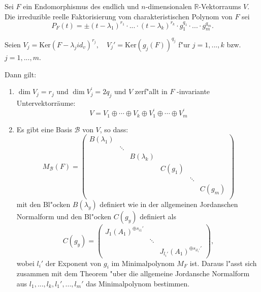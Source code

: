 \documentclass[8pt, a4paper, twocolumn, landscape]{article}
\newcommand{\comment}[1]{}
\begin{document}
\begin{theorem}
Sei $F$ ein Endomorphismus des endlich und $n$-dimensionalen $\mathbb{R}$-Vektorraums $V$. Die irreduzible reelle Faktorisierung vom charakteristischen Polynom von $F$ sei
$$
P_F(t) = \pm (t- \lambda_1)^{r_1} \cdot ... \cdot (t- \lambda_k)^{r_k} \cdot g_1^{q_1} \cdot ... \cdot g_m^{q_m}.
$$ 

Seien
$V_j = \mathrm{Ker}(F- \lambda_j id_v)^{r_j}, \quad V_j' = \mathrm{Ker}(g_j(F))^{q_j}$ f"ur $j = 1, ..., k$ bzw. $j = 1, ..., m$. 
\comment{
Sei 
$$
d_{j r}= \operatorname{dim} \operatorname{Ker}\left(F-\lambda_{j} i d_{V}\right)^{r}, \quad 
d_{j r}^{\prime}=\operatorname{dim} \operatorname{Ker}\left(g_{j}(F)^{r}\right)
$$
f"ur $r = 1, 2, ...$, und setze formal $d_{jr} = d_{jr}' = 0$ f"ur $r \leq 0$. 
}
Dann gilt:
\begin{enumerate}
\item \(\operatorname{dim} V_{j}=r_{j}\) und \(\operatorname{dim} V_{j}^{\prime}=2 q_{j}\) und \(V\) zerf"allt in $F$ -invariante Untervektorräume:
$$
V=V_{1} \oplus \cdots \oplus V_{k} \oplus V_{1}^{\prime} \oplus \cdots \oplus V_{m}^{\prime}
$$
\item Es gibt eine Basis $\mathcal{B}$ von $V$, so dass:
$$
M_\mathcal{B}(F) = \left( \begin{array}{cccccc}B(\lambda_1) & & & & & \\
& \ddots & & & & \\
& & B(\lambda_k) & & & \\
& & & C(g_1) & & \\
& & & & \ddots & \\
& & & & & C(g_m) \\
\end{array}\right)
$$
mit den Bl"ocken $B(\lambda_y)$ definiert wie in der allgemeinen Jordanschen Normalform und den Bl"ocken $C(g_y)$ definiert als 
$$
C(g_y) = \left( \begin{array}{ccc}
J_1(A_1)^{\oplus s_{i1}'}  & & \\
& \ddots & \\
& & J_{l_i'}(A_1)^{\oplus s_{il_i'}'}
\end{array} \right), 
$$
wobei $l_i'$ der Exponent von $g_i$ im Minimalpolynom $M_F$ ist. Daraus l"asst sich zusammen mit dem Theorem "uber die allgemeine Jordansche Normalform aus $l_1, ..., l_k, l_1', ..., l_m'$ das Minimalpolynom bestimmen.
\comment{
$$
M_\mathcal{B}(F)=
\left(\begin{array}{cccc}J_{1}\left(\lambda_{1}\right)^{\oplus s_{11}} & & & \\ 

\end{array}$$}
\end{enumerate}
\end{theorem}
\end{document}

